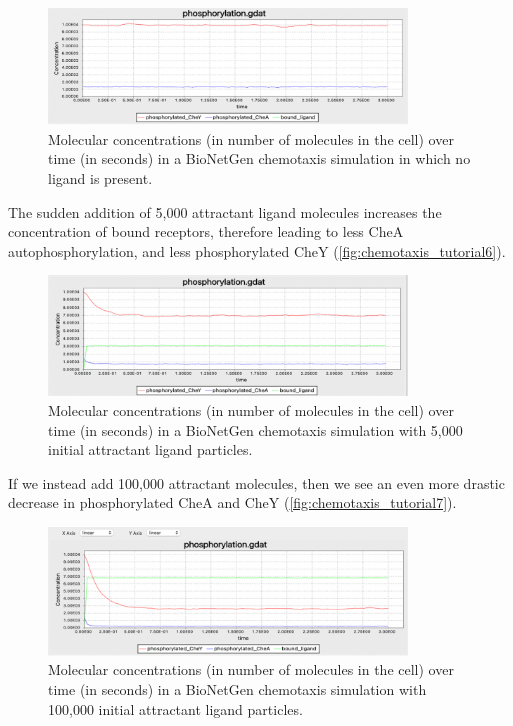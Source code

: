 \begin{figure}[h]
\centering
\mySfFamily
\includegraphics[width = 0.85\textwidth]{../images/chemotaxis_tutorial5.png}
\caption{Molecular concentrations (in number of molecules in the cell) over time (in seconds) in a BioNetGen chemotaxis simulation in which no ligand is present.}
\label{fig:chemotaxis_tutorial5}
\end{figure}

The sudden addition of 5,000 attractant ligand molecules increases the concentration of bound receptors, therefore leading to less CheA autophosphorylation, and less phosphorylated CheY (\autoref{fig:chemotaxis_tutorial6}).\\

\begin{figure}[h]
\centering
\mySfFamily
\includegraphics[width = 0.85\textwidth]{../images/chemotaxis_tutorial6.png}
\caption{Molecular concentrations (in number of molecules in the cell) over time (in seconds) in a BioNetGen chemotaxis simulation with 5,000 initial attractant ligand particles.}
\label{fig:chemotaxis_tutorial6}
\end{figure}

If we instead add 100,000 attractant molecules, then we see an even more drastic decrease in phosphorylated CheA and CheY (\autoref{fig:chemotaxis_tutorial7}).

\begin{figure}[h]
\centering
\mySfFamily
\includegraphics[width = 0.85\textwidth]{../images/chemotaxis_tutorial7.png}
\caption{Molecular concentrations (in number of molecules in the cell) over time (in seconds) in a BioNetGen chemotaxis simulation with 100,000 initial attractant ligand particles.}
\label{fig:chemotaxis_tutorial7}
\end{figure}



